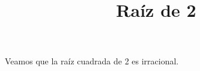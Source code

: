 \documentclass{article}
\begin{document}
\title{Ra\'iz de 2}

Veamos que la ra\'iz cuadrada de 2 es irracional.
\end{document}
